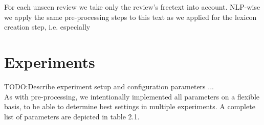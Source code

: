 \documentclass[11pt,titlepage,oneside,openany]{book}
\begin{document}
For each unseen review we take only the review's freetext into account. NLP-wise we apply the same pre-processing steps to this text as we applied for the lexicon creation step, i.e. especially 

\section{Experiments}
TODO:Describe experiment setup and configuration parameters ...\\


As with pre-processing, we intentionally implemented all parameters on a flexible basis, to be able to determine best settings in multiple experiments. A complete list of parameters are depicted in table 2.1.
\end{document}
